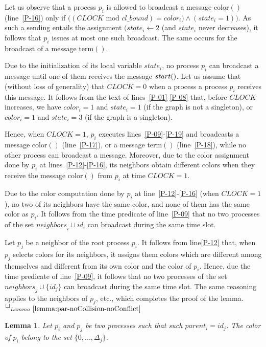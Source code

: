 \documentclass[11pt,english]{article}
\newcommand{\neighbors}{\mathit{neighbors}}
\newcommand{\CLOCK}{\mathit{CLOCK}}
\newtheorem{lemma}{Lemma}
\newcommand{\toto}{xxx}
\newenvironment{proofL}{\noindent{\bf
Proof }} {\hspace*{\fill}$\Box_{Lemma~\ref{\toto}}$\par\vspace{3mm}}
\begin{document}
\begin{proofL}
Let us observe that a process $p_i$ is allowed to broadcast a message 
{\sc color}$()$ (line~\ref{P-16}) only if 
$\big((\CLOCK \mbox{ mod } cl\_bound) = color_i) \wedge (state_i=1)\big)$. 
As such a sending entails the assignment 
$(state_i\leftarrow 2$ (and $state_i$ never decreases), 
it follows that $p_i$ issues at most one such broadcast.  
The same occurs for the broadcast of a message {\sc term}$()$. 

Due to the initialization of its local variable $state_i$, 
no process $p_i$ can broadcast a message until one of them receives the message 
${\sc start}()$. Let  us assume that (without loss of generality) that 
$\CLOCK=0$ when a process a process $p_i$ receives this message. 
It follows from the text of lines~\ref{P-01}-\ref{P-08} that, before
$\CLOCK$ increases, we have 
$color_i=1$ and $state_i=1$ (if the graph is not a singleton), or 
$color_i=1$ and $state_i=3$ (if the graph is a singleton).  

Hence, when $\CLOCK=1$, $p_i$  executes lines~\ref{P-09}-\ref{P-19}
and broadcasts a message {\sc color}$()$ (line~\ref{P-17}), or a message
{\sc term}$()$ (line~\ref{P-18}),
while no other process can broadcast a message. Moreover, 
due to the color assignment done by $p_i$ at lines~\ref{P-12}-\ref{P-16}, 
its neighbors obtain different colors  
when they receive the message {\sc color}$()$ from $p_i$ at time $\CLOCK=1$. 

Due to the color computation done by $p_i$ at line~\ref{P-12}-\ref{P-16} 
(when  $\CLOCK=1$), no two of its neighbors have the same color, and none
of them has the same color as $p_i$. It follows from the time predicate 
of line~\ref{P-09} that no two processes of the set $\neighbors_i \cup id_i$  
can broadcast during the same time slot. 

Let $p_j$ be a neighbor of the root process $p_i$. 
It follows from line\ref{P-12} that, when $p_j$ selects colors for 
its neighbors, it assigns them colors which are different among themselves
and different from its own color and the color of $p_i$. 
Hence, due the  time predicate of line~\ref{P-09}, it follows 
that no two processes  of the set $\neighbors_j \cup \{id_j\}$ can broadcast 
during the same time slot.   
The same  reasoning applies to the neighbors of $p_j$, etc., which completes 
the proof of the lemma. 
\renewcommand{\toto}{lemma:par-noCollision-noConflict}
\end{proofL}


\begin{lemma}
\label{lemma:color-size}
Let $p_i$ and  $p_j$ be two processes such that such  $parent_i=id_j$. 
The color of $p_i$ belong to the set $\{0, ..., \Delta_j\}$. 
\end{lemma}
\end{document}
